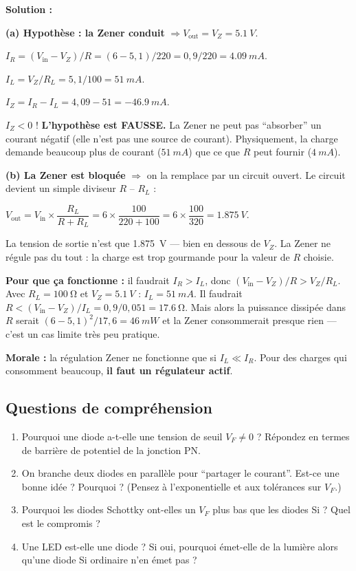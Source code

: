 \documentclass[12pt,a4paper,twoside]{book}
\begin{document}
\begin{pratique}
\textbf{Solution :}

\textbf{(a) Hypothèse : la Zener conduit} $\Rightarrow V_{\text{out}} = V_Z = \SI{5.1}{V}$.

$I_R = (V_{\text{in}} - V_Z)/R = (6 - 5{,}1)/220 = 0{,}9/220 = \SI{4.09}{mA}$.

$I_L = V_Z/R_L = 5{,}1/100 = \SI{51}{mA}$.

$I_Z = I_R - I_L = 4{,}09 - 51 = \SI{-46.9}{mA}$.

$I_Z < 0$ ! \textbf{L'hypothèse est FAUSSE.} La Zener ne peut pas ``absorber'' un courant négatif (elle n'est pas une source de courant). Physiquement, la charge demande beaucoup plus de courant ($\SI{51}{mA}$) que ce que $R$ peut fournir ($\SI{4}{mA}$).

\textbf{(b) La Zener est bloquée} $\Rightarrow$ on la remplace par un circuit ouvert. Le circuit devient un simple diviseur $R$ -- $R_L$ :

$V_{\text{out}} = V_{\text{in}} \times \dfrac{R_L}{R + R_L} = 6 \times \dfrac{100}{220 + 100} = 6 \times \dfrac{100}{320} = \SI{1.875}{V}$.

La tension de sortie n'est que \SI{1.875}{V} --- bien en dessous de $V_Z$. La Zener ne régule pas du tout : la charge est trop gourmande pour la valeur de $R$ choisie.

\textbf{Pour que ça fonctionne :} il faudrait $I_R > I_L$, donc $(V_{\text{in}}-V_Z)/R > V_Z/R_L$. Avec $R_L = \SI{100}{\ohm}$ et $V_Z = \SI{5.1}{V}$ : $I_L = \SI{51}{mA}$. Il faudrait $R < (V_{\text{in}}-V_Z)/I_L = 0{,}9/0{,}051 = \SI{17.6}{\ohm}$. Mais alors la puissance dissipée dans $R$ serait $(6-5{,}1)^2/17{,}6 = \SI{46}{mW}$ et la Zener consommerait presque rien --- c'est un cas limite très peu pratique.

\textbf{Morale :} la régulation Zener ne fonctionne que si $I_L \ll I_R$. Pour des charges qui consomment beaucoup, \textbf{il faut un régulateur actif}.
\end{pratique}

\subsection*{Questions de compréhension}

\begin{enumerate}[nosep]
\item Pourquoi une diode a-t-elle une tension de seuil $V_F \neq 0$ ? Répondez en termes de barrière de potentiel de la jonction PN.
\item On branche deux diodes en parallèle pour ``partager le courant''. Est-ce une bonne idée ? Pourquoi ? (Pensez à l'exponentielle et aux tolérances sur $V_F$.)
\item Pourquoi les diodes Schottky ont-elles un $V_F$ plus bas que les diodes Si ? Quel est le compromis ?
\item Une LED est-elle une diode ? Si oui, pourquoi émet-elle de la lumière alors qu'une diode Si ordinaire n'en émet pas ?
\end{enumerate}
\end{document}
